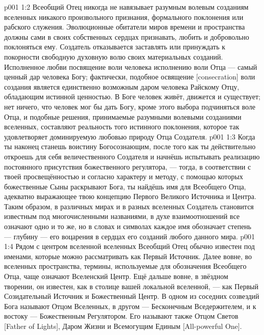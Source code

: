 \vs p001 1:2 Всеобщий Отец никогда не навязывает разумным волевым созданиям вселенных никакого произвольного признания, формального поклонения или рабского служения. Эволюционные обитатели миров времени и пространства должны сами в своих собственных сердцах признавать, любить и добровольно поклоняться ему. Создатель отказывается заставлять или принуждать к покорности свободную духовную волю своих материальных созданий. Исполненное любви посвящение воли человека исполнению воли Отца --- самый ценный дар человека Богу; фактически, подобное освящение [consecration] воли создания является единственно возможным даром человека Райскому Отцу, обладающим истинной ценностью. В Боге человек живёт, движется и существует; нет ничего, что человек мог бы дать Богу, кроме этого выбора подчиняться воле Отца, и подобные решения, принимаемые разумными волевыми созданиями вселенных, составляют реальность того истинного поклонения, которое так удовлетворяет доминируемую любовью природу Отца Создателя.
\vs p001 1:3 Когда ты наконец станешь воистину Богосознающим, после того как ты действительно откроешь для себя величественного Создателя и начнёшь испытывать реализацию постоянного присутствия божественного регулятора, --- тогда, в соответствии с твоей просвещённостью и согласно характеру и методу, с помощью которых божественные Сыны раскрывают Бога, ты найдёшь имя для Всеобщего Отца, адекватно выражающее твою концепцию Первого Великого Источника и Центра. Таким образом, в различных мирах и в разных вселенных Создатель становится известным под многочисленными названиями, в духе взаимоотношений все означают одно и то же, но в словах и символах каждое имя обозначает степень --- глубину --- его воцарения в сердцах его созданий любого данного мира.
\vs p001 1:4 \pc Рядом с центром вселенной вселенных Всеобщий Отец обычно известен под именами, которые можно рассматривать как Первый Источник. Далее вовне, во вселенных пространства, термины, используемые для обозначения Всеобщего Отца, чаще означают Вселенский Центр. Ещё дальше вовне, в звёздном творении, он известен, как в столице вашей локальной вселенной, --- как Первый Созидательный Источник и Божественный Центр. В одном из соседних созвездий Бога называют Отцом Вселенных, в другом --- Бесконечным Вседержителем, и к востоку --- Божественным Регулятором. Его называют также Отцом Светов [Father of Lights], Даром Жизни и Всемогущим Единым [All\hyp{}powerful One].
